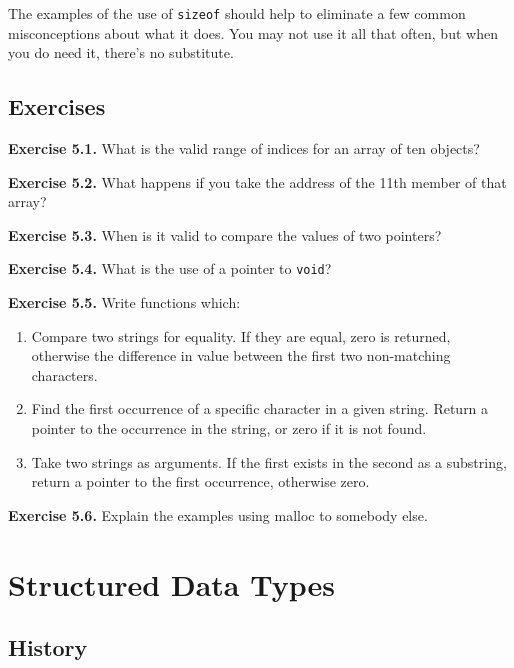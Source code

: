   The examples of the use of \texttt{sizeof} should help to eliminate
   a few common misconceptions about what it does. You may not use it all
   that often, but when you do need it, there's no substitute.


 
        \section{Exercises}
        

  \textbf{Exercise 5.1.} What is the valid range of indices for an array of ten
   objects?


  \textbf{Exercise 5.2.} What happens if you take the address of the 11th member
   of that array?


  \textbf{Exercise 5.3.} When is it valid to compare the values of two
   pointers?


  \textbf{Exercise 5.4.} What is the use of a pointer to
   \texttt{void}?


  \textbf{Exercise 5.5.} Write functions which:

\begin{enumerate}
    \item Compare two strings for equality. If they are equal, zero is returned,
     otherwise the difference in value between the first two non-matching
     characters.

    \item Find the first occurrence of a specific character in a given string.
     Return a pointer to the occurrence in the string, or zero if it is not
     found.

    \item Take two strings as arguments. If the first exists in the second as a
     substring, return a pointer to the first occurrence, otherwise zero.
   \end{enumerate}

  \textbf{Exercise 5.6.} Explain the examples using malloc to somebody
   else.


 \chapter{Structured Data Types}


        \section{History}
        

